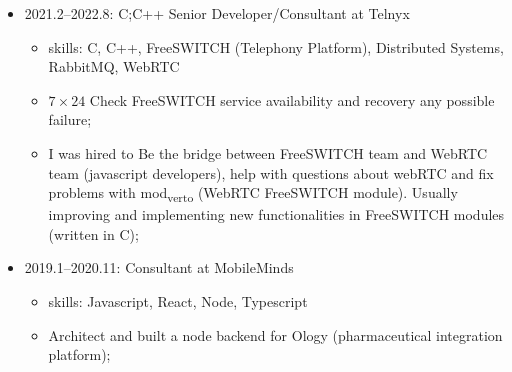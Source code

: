 \documentclass[
]{article}
\providecommand{\tightlist}{%
  \setlength{\itemsep}{0pt}\setlength{\parskip}{0pt}}
\begin{document}
\vspace{2mm}

\begin{itemize}
\tightlist
\item
  2021.2--2022.8: C;C++ Senior Developer/Consultant at Telnyx

  \begin{itemize}
  \tightlist
  \item
    skills: C, C++, FreeSWITCH (Telephony Platform), Distributed
    Systems, RabbitMQ, WebRTC
  \item
    \(7 \times 24\) Check FreeSWITCH service availability and recovery
    any possible failure;
  \item
    I was hired to Be the bridge between FreeSWITCH team and WebRTC team
    (javascript developers), help with questions about webRTC and fix
    problems with mod\textsubscript{verto} (WebRTC FreeSWITCH module).
    Usually improving and implementing new functionalities in FreeSWITCH
    modules (written in C);
  \end{itemize}
\end{itemize}

\vspace{2mm}

\begin{itemize}
\tightlist
\item
  2019.1--2020.11: Consultant at MobileMinds

  \begin{itemize}
  \tightlist
  \item
    skills: Javascript, React, Node, Typescript
  \item
    Architect and built a node backend for Ology (pharmaceutical
    integration platform);
  \end{itemize}
\end{itemize}

\vspace{2mm}
\end{document}
